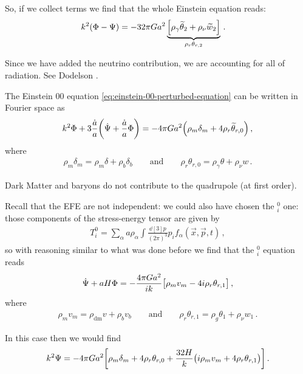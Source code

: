 \documentclass[main.tex]{subfiles}
\begin{document}
So, if we collect terms we find that the whole Einstein equation reads:
%
\begin{align} \label{eq:radiation-temperature-perturbation-term}
k^2 \qty(\Phi - \Psi ) &= - 32 \pi G a^2 
\underbrace{\qty[\rho_{\gamma } \widetilde{\theta}_{2} + \rho_{\nu } \widetilde{w}_{2}] }_{\rho_{r} \theta_{r, 2}} 
\,.
\end{align}

Since we have added the neutrino contribution, we are accounting for all of radiation. 
See Dodelson \cite[page 99]{dodelsonModernCosmology2003}.

The Einstein 00 equation \eqref{eq:einstein-00-perturbed-equation} can be written in Fourier space as 
%
\begin{align}
k^2 \Phi + 3 \frac{\dot{a}}{a} \qty(\dot{\Psi} + \frac{\dot{a}}{a} \Phi )
= -4 \pi G a^2 \qty(\rho_{m } \delta_{m} + 4 \rho_{r} \widetilde{\theta}_{r, 0}) 
\,,
\end{align}
%
where 
%
\begin{align}
\rho_{m} \delta_{m} = \rho_{m} \delta + \rho_{b} \delta_{b} 
\qquad \text{and} \qquad
\rho_{r} \theta_{r, 0} = \rho_{\gamma } \theta + \rho_{\nu } w
\,.
\end{align}

Dark Matter and baryons do not contribute to the quadrupole (at first order). 

Recall that the EFE are not independent: we could also have chosen the \(^0_i\) one: those components of the stress-energy tensor are given by 
%
\begin{align}
T^{0}_{i} = \sum _{\alpha } a \rho_{\alpha } 
\int \frac{ \dd[3]{p}}{(2\pi )^3} p_{i} f_\alpha  (\vec{x}, \vec{p}, t)
\,,
\end{align}
%
so with reasoning similar to what was done before we find that the \(^0_{i}\) equation reads
%
\begin{align}
\dot{\Psi} + a H \Phi = - \frac{4 \pi G a^2}{ik}
\qty[\rho_{m} v_{m} - 4 i \rho_{r} \theta_{r, 1}]
\,,
\end{align}
%
where 
%
\begin{align}
\rho_{m} v_{m} = \rho _{\text{dm}} v + \rho_{b} v_{b}
\qquad \text{and} \qquad
\rho_{r} \theta_{r, 1} = \rho_{g} \theta_1 + \rho_{\nu } w_{1}
\,.
\end{align}

In this case then we would find
%
\begin{align}
k^2 \Psi = -4\pi G a^2
\qty[\rho_{m} \delta_{m} + 4 \rho_{r} \theta_{r, 0}
+ \frac{32H}{k} \qty(i \rho_{m} v_m + 4 \rho_{r} \theta_{r, 1})]
\,.
\end{align}
\end{document}
